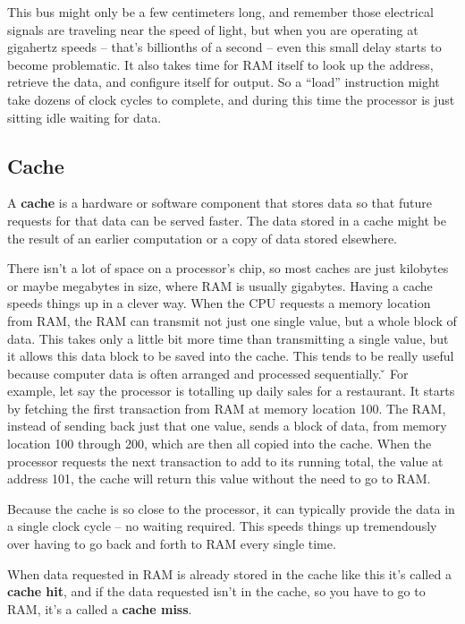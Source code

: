 This bus might only be a few centimeters long, and remember those electrical signals are traveling near the speed of
light, but when you are operating at gigahertz speeds – that's billionths of a second – even this small delay starts
to become problematic. It also takes time for RAM itself to look up the address, retrieve the data, and configure
itself for output. So a ``load'' instruction might take dozens of clock cycles to complete, and during this
time the processor is just sitting idle waiting for data.

\subsection{Cache}

\bd[Cache]
A \textbf{cache} is a hardware or software component that stores data so that future requests for that data can be
served faster. The data stored in a cache might be the result of an earlier computation or a copy of data stored
elsewhere.
\ed

There isn't a lot of space on a processor's chip, so most caches are just kilobytes or maybe megabytes in size, where
RAM is usually gigabytes. Having a cache speeds things up in a clever way. When the CPU requests a memory location
from RAM, the RAM can transmit not just one single value, but a whole block of data. This takes only a little bit
more time than transmitting a single value, but it allows this data block to be saved into the cache. This tends to
be really useful because computer data is often arranged and processed sequentially. \v

\be
For example, let say the processor is totalling up daily sales for a restaurant. It starts by fetching the first
transaction from RAM at memory location 100. The RAM, instead of sending back just that one value, sends a block of
data, from memory location 100 through 200, which are then all copied into the cache. When the processor requests the
next transaction to add to its running total, the value at address 101, the cache will return this value without the
need to go to RAM\@.
\ee

Because the cache is so close to the processor, it can typically provide the data in a single clock cycle -- no
waiting required. This speeds things up tremendously over having to go back and forth to RAM every single time.

When data requested in RAM is already stored in the cache like this it's called a \textbf{cache hit}, and if the data
requested isn't in the cache, so you have to go to RAM, it's a called a \textbf{cache miss}.
\ed

